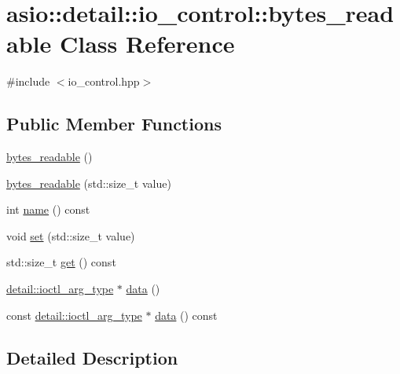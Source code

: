 \hypertarget{classasio_1_1detail_1_1io__control_1_1bytes__readable}{}\section{asio\+:\+:detail\+:\+:io\+\_\+control\+:\+:bytes\+\_\+readable Class Reference}
\label{classasio_1_1detail_1_1io__control_1_1bytes__readable}


{\ttfamily \#include $<$io\+\_\+control.\+hpp$>$}

\subsection*{Public Member Functions}
\begin{DoxyCompactItemize}
\item 
\hyperlink{classasio_1_1detail_1_1io__control_1_1bytes__readable_ab6570cf3dde553e8235764e7ddb3bedd}{bytes\+\_\+readable} ()
\item 
\hyperlink{classasio_1_1detail_1_1io__control_1_1bytes__readable_a2aef63faf74cd5450291c32f00def2e4}{bytes\+\_\+readable} (std\+::size\+\_\+t value)
\item 
int \hyperlink{classasio_1_1detail_1_1io__control_1_1bytes__readable_a20044117f07f99b67b0daa9c04aaf74b}{name} () const 
\item 
void \hyperlink{classasio_1_1detail_1_1io__control_1_1bytes__readable_a90fc57f95e23a2959eef843f9c20cd33}{set} (std\+::size\+\_\+t value)
\item 
std\+::size\+\_\+t \hyperlink{classasio_1_1detail_1_1io__control_1_1bytes__readable_aa6b38448b5daa5b6dd03f9c3c9a1cb08}{get} () const 
\item 
\hyperlink{namespaceasio_1_1detail_a27f72e1b8b785eaaa59ddc6b41751106}{detail\+::ioctl\+\_\+arg\+\_\+type} $\ast$ \hyperlink{classasio_1_1detail_1_1io__control_1_1bytes__readable_ab35b72f830ca3f63ea5b44a6b50c5325}{data} ()
\item 
const \hyperlink{namespaceasio_1_1detail_a27f72e1b8b785eaaa59ddc6b41751106}{detail\+::ioctl\+\_\+arg\+\_\+type} $\ast$ \hyperlink{classasio_1_1detail_1_1io__control_1_1bytes__readable_adfb8004c4b77f5f6e6e512531abf0f22}{data} () const 
\end{DoxyCompactItemize}


\subsection{Detailed Description}


